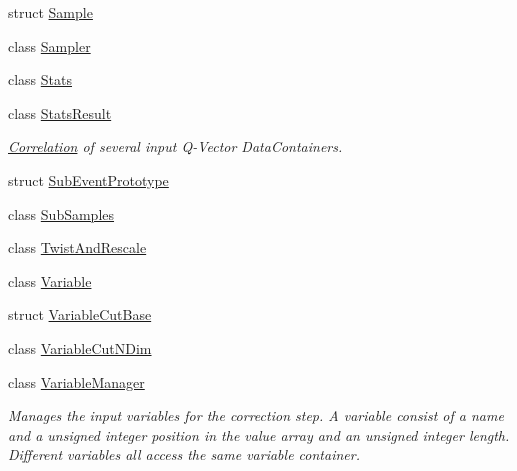 \begin{DoxyCompactItemize}
struct \mbox{\hyperlink{structQn_1_1Sample}{Sample}}
\item 
class \mbox{\hyperlink{classQn_1_1Sampler}{Sampler}}
\item 
class \mbox{\hyperlink{classQn_1_1Stats}{Stats}}
\item 
class \mbox{\hyperlink{classQn_1_1StatsResult}{Stats\+Result}}
\begin{DoxyCompactList}\small\item\em \mbox{\hyperlink{classQn_1_1Correlation}{Correlation}} of several input Q-\/\+Vector Data\+Containers. \end{DoxyCompactList}\item 
struct \mbox{\hyperlink{structQn_1_1SubEventPrototype}{Sub\+Event\+Prototype}}
\item 
class \mbox{\hyperlink{classQn_1_1SubSamples}{Sub\+Samples}}
\item 
class \mbox{\hyperlink{classQn_1_1TwistAndRescale}{Twist\+And\+Rescale}}
\item 
class \mbox{\hyperlink{classQn_1_1Variable}{Variable}}
\item 
struct \mbox{\hyperlink{structQn_1_1VariableCutBase}{Variable\+Cut\+Base}}
\item 
class \mbox{\hyperlink{classQn_1_1VariableCutNDim}{Variable\+Cut\+N\+Dim}}
\item 
class \mbox{\hyperlink{classQn_1_1VariableManager}{Variable\+Manager}}
\begin{DoxyCompactList}\small\item\em Manages the input variables for the correction step. A variable consist of a name and a unsigned integer position in the value array and an unsigned integer length. Different variables all access the same variable container. \end{DoxyCompactList}\end{DoxyCompactItemize}
